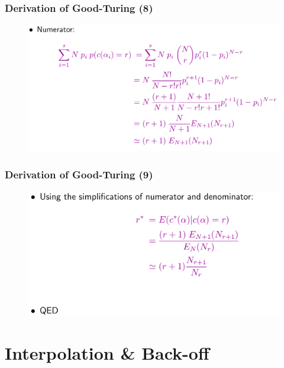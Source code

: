\documentclass{beamer}
\begin{document}
\begin{frame}\frametitle{Derivation of Good-Turing (8)}
\begin{figure}
\includegraphics[width=0.9\linewidth]{figure/derivation_good_turing_8.pdf}
\end{figure}
\end{frame}


\begin{frame}\frametitle{Derivation of Good-Turing (9)}
\begin{figure}
\includegraphics[width=0.9\linewidth]{figure/derivation_good_turing_9.pdf}
\end{figure}
\end{frame}





\section{Interpolation \& Back-off}
\end{document}
